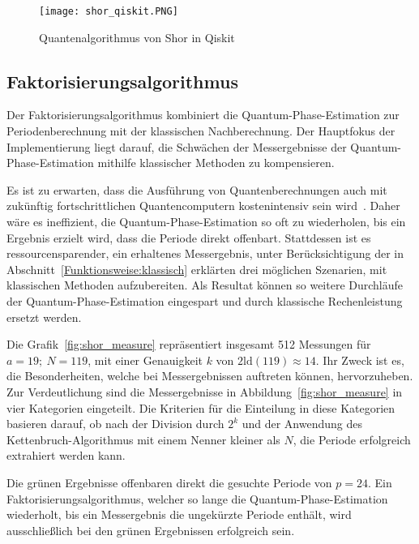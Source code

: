 \begin{figure}[H]
  \centering
  \texttt{[image: shor\_qiskit.PNG]}
  \caption{Quantenalgorithmus von Shor in Qiskit}
  \label{fig:shor_qiskit}
\end{figure}

\subsection{Faktorisierungsalgorithmus} \label{sec:Faktorisierungsalgorithmus}
Der Faktorisierungsalgorithmus kombiniert die Quantum-Phase-Estimation zur Periodenberechnung mit  
der klassischen Nachberechnung. 
Der Hauptfokus der Implementierung liegt darauf, 
die Schwächen der Messergebnisse der Quantum-Phase-Estimation mithilfe klassischer Methoden zu kompensieren.

Es ist zu erwarten, 
dass die Ausführung von Quantenberechnungen auch mit zukünftig fortschrittlichen Quantencomputern kostenintensiv sein wird~\cite{Shor_1997}.
Daher wäre es ineffizient, 
die Quantum-Phase-Estimation so oft zu wiederholen, 
bis ein Ergebnis erzielt wird, dass die Periode direkt offenbart.
Stattdessen ist es ressourcensparender, 
ein erhaltenes Messergebnis, 
unter Berücksichtigung der in Abschnitt~\ref{Funktionsweise:klassisch} erklärten drei möglichen Szenarien,
mit klassischen Methoden aufzubereiten. 
Als Resultat können so weitere Durchläufe der Quantum-Phase-Estimation eingespart und 
durch klassische Rechenleistung ersetzt werden.

\vspace{1em}

Die Grafik~\ref{fig:shor_measure} repräsentiert insgesamt 512 Messungen für \(a=19;~N=119\), 
mit einer Genauigkeit \(k\) von \(2\text{ld}(119) \approx 14 \). 
Ihr Zweck ist es, die Besonderheiten, 
welche bei Messergebnissen auftreten können, hervorzuheben.
Zur Verdeutlichung sind die Messergebnisse in Abbildung~\ref{fig:shor_measure} in vier Kategorien eingeteilt.
Die Kriterien für die Einteilung in diese Kategorien basieren darauf, 
ob nach der Division durch \(2^k\) und 
der Anwendung des Kettenbruch-Algorithmus mit einem Nenner kleiner als \(N\), 
die Periode erfolgreich extrahiert werden kann.

Die grünen Ergebnisse offenbaren direkt die gesuchte Periode von \(p = 24\).
Ein Faktorisierungsalgorithmus, welcher so lange die Quantum-Phase-Estimation wiederholt, 
bis ein Messergebnis die ungekürzte Periode enthält, 
wird ausschließlich bei den grünen Ergebnissen erfolgreich sein.

